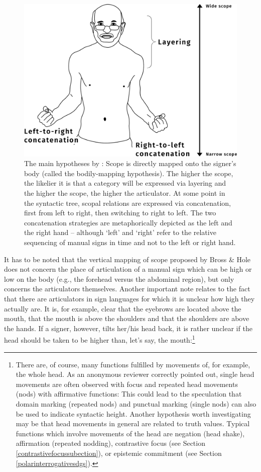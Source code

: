 \begin{figure}[bt]
\centering
	\includegraphics[width=1.0\textwidth]{hypo}
	\caption{The main hypotheses by \citet{bross2017scope}: Scope is directly mapped onto the signer's body (called the bodily-mapping hypothesis). The higher the scope, the likelier it is that a category will be expressed via layering and the higher the scope, the higher the articulator. At some point in the syntactic tree, scopal relations are expressed via concatenation, first from left to right, then switching to right to left. The two concatenation strategies are metaphorically depicted as the left and the right hand -- although `left' and `right' refer to the relative sequencing of manual signs in time and not to the left or right hand.}
	\label{hypo}
\end{figure}	

\noindent It has to be noted that the vertical mapping of scope proposed by Bross \& Hole does not concern the place of articulation of a manual sign which can be high or low on the body (e.g., the forehead versus the abdominal region), but only concerns the articulators themselves. Another important note relates to the fact that there are articulators in sign languages for which it is unclear how high they actually are. It is, for example, clear that the eyebrows are located above the mouth, that the mouth is above the shoulders and that the shoulders are above the hands. If a signer, however, tilts her/his head back, it is rather unclear if the head should be taken to be higher than, let's say, the mouth:\footnote{ There are, of course, many functions fulfilled by movements of, for example, the whole head. As an anonymous reviewer correctly pointed out, single head movements are often observed with focus and repeated head movements (nods) with affirmative functions: This could lead to the speculation that domain marking (repeated nods) and punctual marking (single nods) can also be used to indicate syntactic height. Another hypothesis worth investigating may be that head movements in general are related to truth values. Typical functions which involve movements of the head are negation (head shake), affirmation (repeated nodding), contrastive focus (see Section \ref{contrastivefocussubection}), or epistemic commitment (see Section \ref{polarinterrogativesdgs}).}\label{nesting}

